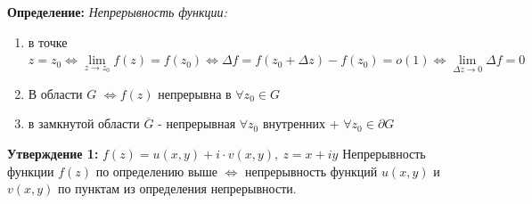 \textbf{Определение:} \emph{Непрерывность функции:}

\begin{enumerate}
\def\labelenumi{\arabic{enumi}.}
\tightlist
\item
  в точке
  \(z=z_{0}\Leftrightarrow \lim\limits_{ z \to z_{0} }f(z)=f(z_{0})\Leftrightarrow\Delta f=f(z_{0}+\Delta z)-f(z_{0})=o(1)\Leftrightarrow \lim\limits_{ \Delta z \to 0 }\Delta f=0\)
\item
  В области \(G\) \(\Leftrightarrow f(z)\) непрерывна в
  \(\forall z_{0}\in G\)
\item
  в замкнутой области \(\overline{G}\) - непрерывная \(\forall z_{0}\)
  внутренних + \(\forall z_{0}\in\partial G\)
\end{enumerate}

\textbf{Утверждение 1:} \(f(z)=u(x,y)+i\cdot v(x,y), \ z=x+iy\)
Непрерывность функции \(f(z)\) по определению выше \(\Leftrightarrow\)
непрерывность функций \(u(x,y)\) и \(v(x,y)\) по пунктам из определения
непрерывности.
